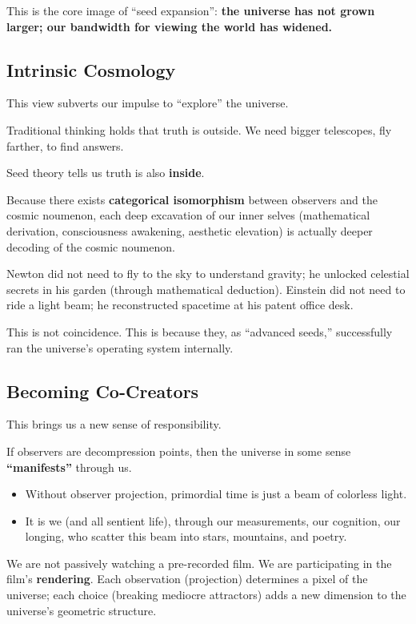 \documentclass[11pt,a4paper,twoside]{book}
\begin{document}
This is the core image of ``seed expansion'': \textbf{the universe has not grown larger; our bandwidth for viewing the world has widened.}

\subsection{Intrinsic Cosmology}

This view subverts our impulse to ``explore'' the universe.

Traditional thinking holds that truth is outside. We need bigger telescopes, fly farther, to find answers.

Seed theory tells us truth is also \textbf{inside}.

Because there exists \textbf{categorical isomorphism} between observers and the cosmic noumenon, each deep excavation of our inner selves (mathematical derivation, consciousness awakening, aesthetic elevation) is actually deeper decoding of the cosmic noumenon.

Newton did not need to fly to the sky to understand gravity; he unlocked celestial secrets in his garden (through mathematical deduction). Einstein did not need to ride a light beam; he reconstructed spacetime at his patent office desk.

This is not coincidence. This is because they, as ``advanced seeds,'' successfully ran the universe's operating system internally.

\subsection{Becoming Co-Creators}

This brings us a new sense of responsibility.

If observers are decompression points, then the universe in some sense \textbf{``manifests''} through us.

\begin{itemize}
\item Without observer projection, primordial time is just a beam of colorless light.

\item It is we (and all sentient life), through our measurements, our cognition, our longing, who scatter this beam into stars, mountains, and poetry.
\end{itemize}

We are not passively watching a pre-recorded film. We are participating in the film's \textbf{rendering}. Each observation (projection) determines a pixel of the universe; each choice (breaking mediocre attractors) adds a new dimension to the universe's geometric structure.
\end{document}
